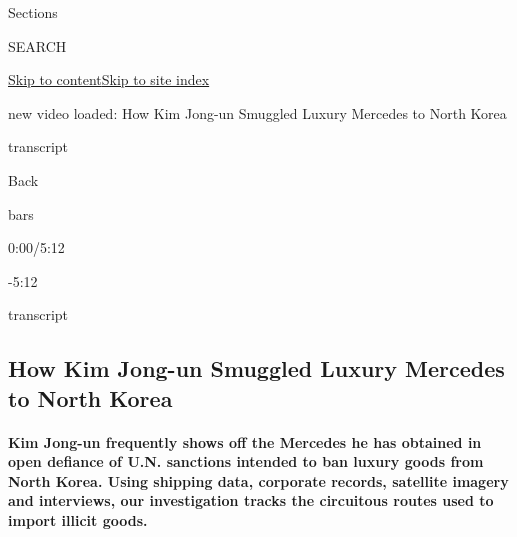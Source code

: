 Sections

SEARCH

\protect\hyperlink{site-content}{Skip to
content}\protect\hyperlink{site-index}{Skip to site index}

new video loaded: How Kim Jong-un Smuggled Luxury Mercedes to North
Korea

transcript

Back

bars

0:00/5:12

-5:12

transcript

\hypertarget{how-kim-jong-un-smuggled-luxury-mercedes-to-north-korea}{%
\subsection{How Kim Jong-un Smuggled Luxury Mercedes to North
Korea}\label{how-kim-jong-un-smuggled-luxury-mercedes-to-north-korea}}

\hypertarget{kim-jong-un-frequently-shows-off-the-mercedes-he-has-obtained-in-open-defiance-of-un-sanctions-intended-to-ban-luxury-goods-from-north-korea-using-shipping-data-corporate-records-satellite-imagery-and-interviews-our-investigation-tracks-the-circuitous-routes-used-to-import-illicit-goods}{%
\paragraph{Kim Jong-un frequently shows off the Mercedes he has obtained
in open defiance of U.N. sanctions intended to ban luxury goods from
North Korea. Using shipping data, corporate records, satellite imagery
and interviews, our investigation tracks the circuitous routes used to
import illicit
goods.}\label{kim-jong-un-frequently-shows-off-the-mercedes-he-has-obtained-in-open-defiance-of-un-sanctions-intended-to-ban-luxury-goods-from-north-korea-using-shipping-data-corporate-records-satellite-imagery-and-interviews-our-investigation-tracks-the-circuitous-routes-used-to-import-illicit-goods}}


